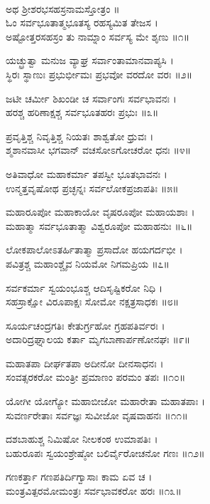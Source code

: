 \\

ಅಥ ಶ್ರೀಶರಭಸಹಸ್ರನಾಮಸ್ತೋತ್ರಂ ॥\\
ಓಂ ಸರ್ವಭೂತಾತ್ಮಭೂತಸ್ಯ ರಹಸ್ಯಮಿತ ತೇಜಸ ।\\
ಅಷ್ಟೋತ್ತರಸಹಸ್ರಂ ತು ನಾಮ್ನಾಂ ಸರ್ವಸ್ಯ ಮೇ ಶೃಣು ॥೧॥

ಯಚ್ಛ್ರುತ್ವಾ ಮನುಜ ವ್ಯಾಘ್ರ ಸರ್ವಾಂತಾಮಾನವಾಪ್ಯಸಿ ।\\
ಸ್ಥಿರಃ ಸ್ಥಾಣುಃ ಪ್ರಭುರ್ಭೀಮಃ ಪ್ರಭವೋ ವರದೋ ವರಃ ॥೨॥

ಜಟೀ ಚರ್ಮೀ ಶಿಖಂಡೀ ಚ ಸರ್ವಾಂಗಃ ಸರ್ವಭಾವನಃ ।\\
ಹರಶ್ಚ ಹರಿಣಾಕ್ಷಶ್ಚ ಸರ್ವಭೂತಹರಃ ಪ್ರಭುಃ ॥೩॥

ಪ್ರವೃತ್ತಿಶ್ಚ ನಿವೃತ್ತಿಶ್ಚ ನಿಯತಃ ಶಾಶ್ವತೋ ಧ್ರುವಃ ।\\
ಶ್ಮಶಾನವಾಸೀ ಭಗವಾನ್ ವಚಸೋಽಗೋಚರೋ ಧನಃ ॥೪॥

ಅತಿವಾಧೋ ಮಹಾಕರ್ಮಾ ತಪಸ್ವೀ ಭೂತಭಾವನಃ ।\\
ಉನ್ಮತ್ತವೃಷೋಥ ಪ್ರಚ್ಛನ್ನಃ ಸರ್ವಲೋಕಪ್ರಜಾಪತಿಃ ॥೫॥

ಮಹಾರೂಪೋ ಮಹಾಕಾಯೋ ವೃಷರೂಪೋ ಮಹಾಯಶಾಃ ।\\
ಮಹಾತ್ಮಾ ಸರ್ವಭೂತಾತ್ಮಾ ವಿಶ್ವರೂಪೋ ಮಹಾಹನುಃ ॥೬॥

ಲೋಕಪಾಲೋಽತರ್ಹಿತಾತ್ಮಾ ಪ್ರಸಾದೋ ಹಯಗರ್ದಭೀ ।\\
ಪವಿತ್ರಶ್ಚ ಮಹಾಂಶ್ಚೈವ ನಿಯಮೋ ನಿಗಮಪ್ರಿಯ ॥೭॥

ಸರ್ವಕರ್ಮಾ ಸ್ವಯಂಭೂಶ್ಚ ಆದಿಸೃಷ್ಟಿಕರೋ ನಿಧಿ ।\\
ಸಹಸ್ರಾಕ್ಷೋ ವಿರೂಪಾಕ್ಷಃ ಸೋಮೋ ನಕ್ಷತ್ರಸಾಧಕಃ ॥೮॥

ಸೂರ್ಯಚಂದ್ರಗತಿಃ ಕೇತುರ್ಗ್ರಹೋ ಗ್ರಹಪತಿರ್ವರಃ ।\\
ಅದಾರಿದ್ರಘ್ನಾಲಯ ಕರ್ತಾ ಮೃಗಬಾಣಾರ್ಪಣೋನಘಃ ॥೯॥

ಮಹಾತಪಾ ದೀರ್ಘತಪಾ ಅದೀನೋ ದೀನಸಾಧನಃ ।\\
ಸಂವತ್ಸರಕರೋ ಮಂತ್ರೀ ಪ್ರಮಾಣಂ ಪರಮಂ ತಪಃ ॥೧೦॥

ಯೋಗೀ ಯೋಗ್ಯೋ ಮಹಾಬೀಜೋ ಮಹಾರೇತಾ ಮಹಾತಪಾಃ ।\\
ಸುವರ್ಣರೇತಾಃ ಸರ್ವಜ್ಞಃ ಸುವೀಜೋ ವೃಷವಾಹನಃ ॥೧೧॥

ದಶಬಾಹುಶ್ಚ ನಿಮಿಷೋ ನೀಲಕಂಠ ಉಮಾಪತಿಃ ।\\
ಬಹುರೂಪಃ ಸ್ವಯಂಶ್ರೇಷ್ಠೋ ಬಲಿರ್ವೈರೋಚನೋ ಗಣಃ ॥೧೨॥

ಗಣಕರ್ತ್ತಾ ಗಣಪತಿರ್ದಿಗ್ವಾಸಾಃ ಕಾಮ ಏವ ಚ ।\\
ಮಂತ್ರವಿತ್ಪರಮೋಮಂತ್ರಃ ಸರ್ವಭಾವಕರೋ ಹರಃ ॥೧೩॥

